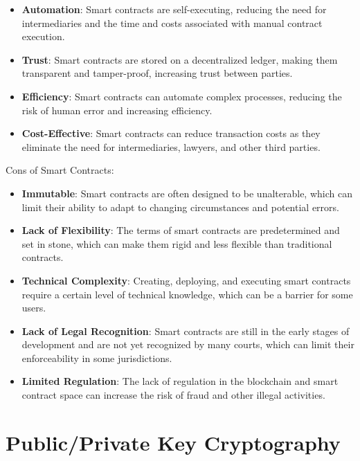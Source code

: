 \documentclass[target=mst,aauheader=]{thud}
\begin{document}
    \begin{itemize}    

        \item \textbf{Automation}: Smart contracts are self-executing, reducing the need for intermediaries and the time and costs associated with manual contract execution.
        \item \textbf{Trust}: Smart contracts are stored on a decentralized ledger, making them transparent and tamper-proof, increasing trust between parties.
        \item \textbf{Efficiency}: Smart contracts can automate complex processes, reducing the risk of human error and increasing efficiency.
        \item \textbf{Cost-Effective}: Smart contracts can reduce transaction costs as they eliminate the need for intermediaries, lawyers, and other third parties.

    \end{itemize}

    Cons of Smart Contracts:

    \begin{itemize}

        \item \textbf{Immutable}: Smart contracts are often designed to be unalterable, which can limit their ability to adapt to changing circumstances and potential errors.
        \item \textbf{Lack of Flexibility}: The terms of smart contracts are predetermined and set in stone, which can make them rigid and less flexible than traditional contracts.
        \item \textbf{Technical Complexity}: Creating, deploying, and executing smart contracts require a certain level of technical knowledge, which can be a barrier for some users.
        \item \textbf{Lack of Legal Recognition}: Smart contracts are still in the early stages of development and are not yet recognized by many courts, which can limit their enforceability in some jurisdictions.
        \item \textbf{Limited Regulation}: The lack of regulation in the blockchain and smart contract space can increase the risk of fraud and other illegal activities.

    \end{itemize}


    \section{Public/Private Key Cryptography}
    
\end{document}
